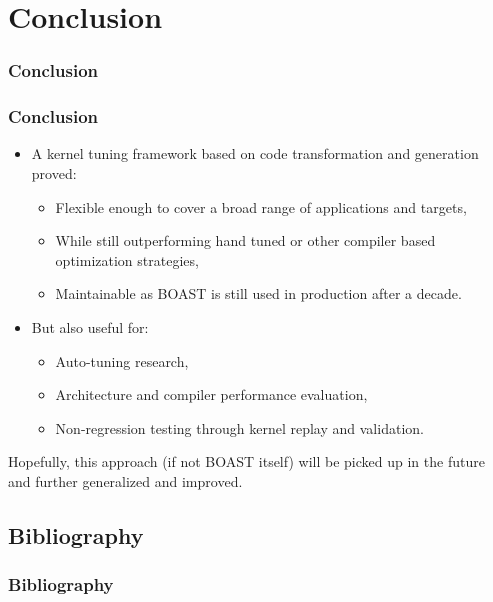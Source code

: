 \documentclass{beamer}
\begin{document}

\section{Conclusion}

\begin{frame}
\frametitle{Conclusion}
\end{frame}

\begin{frame}
  \frametitle{Conclusion}
  \begin{itemize}
    \item A kernel tuning framework based on code transformation and generation proved:
    \begin{itemize}
      \item Flexible enough to cover a broad range of applications and targets,
      \item While still outperforming hand tuned or other compiler based optimization strategies,
      \item Maintainable as BOAST is still used in production after a decade.
    \end{itemize}
    \item But also useful for:
    \begin{itemize}
      \item Auto-tuning research,
      \item Architecture and compiler performance evaluation,
      \item Non-regression testing through kernel replay and validation.
    \end{itemize}
  \end{itemize}
  Hopefully, this approach (if not BOAST itself) will be picked up in the future and further generalized and improved.
\end{frame}

\appendix
\subsection{Bibliography}

\begin{frame}[shrink=50]
  \frametitle{Bibliography}
  
\end{frame}
\end{document}
